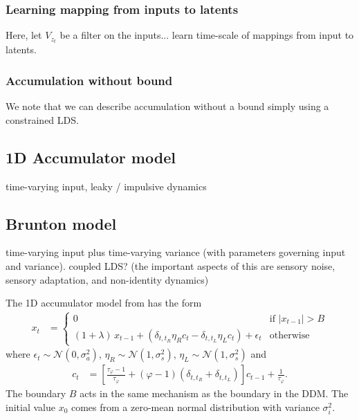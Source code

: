 \documentclass{article}
\begin{document}
\subsubsection{Learning mapping from inputs to latents}
Here, let $V_{z_t}$ be a filter on the inputs... learn time-scale of mappings from input to latents. 

\subsubsection{Accumulation without bound}
We note that we can describe accumulation without a bound simply using a constrained LDS. 

\subsection{1D Accumulator model}
time-varying input, leaky / impulsive dynamics 

\subsection{Brunton model}
time-varying input plus time-varying variance (with parameters governing input and variance). coupled LDS?
(the important aspects of this are sensory noise, sensory adaptation, and non-identity dynamics)

The 1D accumulator model from \cite{brunton2013rats} has the form
\begin{align*}
x_t &= 
\begin{cases}
0 & \text{if } |x_{t-1}|>B \\
(1 + \lambda) \, x_{t-1} + \left( \delta_{t,t_R} \eta_R c_t - \delta_{t,t_L} \eta_L c_t \right) + \epsilon_t & \text{otherwise}
\end{cases}
\end{align*}
where $\epsilon_t \sim \mathcal{N}(0,\sigma_a^2)$, $\eta_R \sim \mathcal{N}(1, \sigma_s^2)$, $\eta_L \sim \mathcal{N}(1, \sigma_s^2)$ and 
\begin{align*}
c_t &= \left[ \frac{\tau_\varphi - 1}{\tau_\varphi} + (\varphi - 1) (\delta_{t,t_R} + \delta_{t,t_L}) \right] c_{t-1} + \frac{1}{\tau_\varphi}.
\end{align*}
The boundary $B$ acts in the same mechanism as the boundary in the DDM. The initial value $x_0$ comes from a zero-mean normal distribution with variance $\sigma_i^2$.
\end{document}
